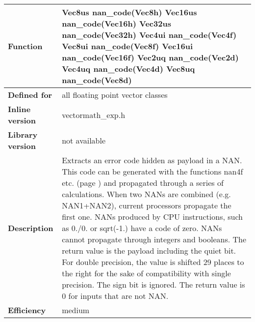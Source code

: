 \documentclass[vcl_manual.tex]{subfiles}
\begin{document}
\label{nanCode}
\begin{tabular}{|p{30mm}|p{120mm}|}
\hline
\bfseries Function & 
Vec8us nan\_code(Vec8h)\newline
Vec16us nan\_code(Vec16h)\newline
Vec32us nan\_code(Vec32h)\newline
Vec4ui nan\_code(Vec4f)\newline
Vec8ui nan\_code(Vec8f)\newline
Vec16ui nan\_code(Vec16f)\newline
Vec2uq nan\_code(Vec2d)\newline
Vec4uq nan\_code(Vec4d)\newline
Vec8uq nan\_code(Vec8d) \\ \hline
\bfseries Defined for & all floating point vector classes \\ \hline
\bfseries Inline version & vectormath\_exp.h \\ \hline
\bfseries Library version & not available \\ \hline
\bfseries Description & Extracts an error code hidden as payload in a NAN. This code can be generated with the functions nan4f etc. (page \pageref{nan4f}) and propagated through a series of calculations. When two NANs are combined (e.g. NAN1+NAN2), current processors propagate the first one. NANs produced by CPU instructions, such as 0./0. or sqrt(-1.) have a code of zero. NANs cannot propagate through integers and booleans.\newline
The return value is the payload including the quiet bit. For double precision, the value is shifted 29 places to the right for the sake of compatibility with single precision.\newline
The sign bit is ignored.\newline
The return value is 0 for inputs that are not NAN. \\ \hline
\bfseries Efficiency & medium \\ \hline
\end{tabular}
\end{document}
